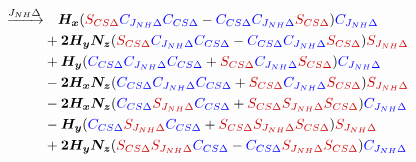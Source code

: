 \documentclass{tufte-book}
\begin{document}
\begin{align*} %
\xrightarrow{\mathmakebox[2em]{J_{NH} \Delta}}
 & \quad \boldsymbol{H_x} (\textcolor{red!80!black}{S_{CS\Delta}} \textcolor{blue}{C_{J_{NH} \Delta}} \textcolor{blue}{C_{CS\Delta}} -
                      \textcolor{blue}{C_{CS\Delta}} \textcolor{blue}{C_{J_{NH} \Delta}} \textcolor{red!80!black}{S_{CS\Delta}}) \textcolor{blue}{C_{J_{NH} \Delta}}  \\
 &     + \boldsymbol{2 H_y N_z} (\textcolor{red!80!black}{S_{CS\Delta}} \textcolor{blue}{C_{J_{NH} \Delta}} \textcolor{blue}{C_{CS\Delta}} -
                            \textcolor{blue}{C_{CS\Delta}} \textcolor{blue}{C_{J_{NH} \Delta}} \textcolor{red!80!black}{S_{CS\Delta}}) \textcolor{red!80!black}{S_{J_{NH} \Delta}} \\
 &     + \boldsymbol{H_y} (\textcolor{blue}{C_{CS\Delta}} \textcolor{blue}{C_{J_{NH} \Delta}} \textcolor{blue}{C_{CS\Delta}} +
                      \textcolor{red!80!black}{S_{CS\Delta}} \textcolor{blue}{C_{J_{NH} \Delta}} \textcolor{red!80!black}{S_{CS\Delta}}) \textcolor{blue}{C_{J_{NH} \Delta}} \\
 &     - \boldsymbol{2H_x N_z} (\textcolor{blue}{C_{CS\Delta}} \textcolor{blue}{C_{J_{NH} \Delta}} \textcolor{blue}{C_{CS\Delta}} +
                           \textcolor{red!80!black}{S_{CS\Delta}} \textcolor{blue}{C_{J_{NH} \Delta}} \textcolor{red!80!black}{S_{CS\Delta}}) \textcolor{red!80!black}{S_{J_{NH} \Delta}} \\
 &     - \boldsymbol{2H_x N_z} (\textcolor{blue}{C_{CS\Delta}} \textcolor{red!80!black}{S_{J_{NH} \Delta}} \textcolor{blue}{C_{CS\Delta}} +
                           \textcolor{red!80!black}{S_{CS\Delta}} \textcolor{red!80!black}{S_{J_{NH} \Delta}} \textcolor{red!80!black}{S_{CS\Delta}}) \textcolor{blue}{C_{J_{NH} \Delta}} \\
 &     - \boldsymbol{H_y} (\textcolor{blue}{C_{CS\Delta}} \textcolor{red!80!black}{S_{J_{NH} \Delta}} \textcolor{blue}{C_{CS\Delta}} +
                      \textcolor{red!80!black}{S_{CS\Delta}} \textcolor{red!80!black}{S_{J_{NH} \Delta}} \textcolor{red!80!black}{S_{CS\Delta}}) \textcolor{red!80!black}{S_{J_{NH} \Delta}} \\
 &     + \boldsymbol{2H_y N_z} (\textcolor{red!80!black}{S_{CS\Delta}} \textcolor{red!80!black}{S_{J_{NH} \Delta}} \textcolor{blue}{C_{CS\Delta}} -
                           \textcolor{blue}{C_{CS\Delta}} \textcolor{red!80!black}{S_{J_{NH} \Delta}} \textcolor{red!80!black}{S_{CS\Delta}}) \textcolor{blue}{C_{J_{NH} \Delta}} \\

\end{align*}
\end{document}
